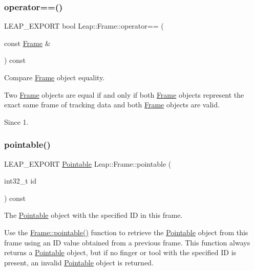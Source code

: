 \subsubsection{\texorpdfstring{operator==()}{operator==()}}
{\footnotesize\ttfamily L\+E\+A\+P\+\_\+\+E\+X\+P\+O\+RT bool Leap\+::\+Frame\+::operator== (\begin{DoxyParamCaption}\item[{const \hyperlink{class_leap_1_1_frame}{Frame} \&}]{ }\end{DoxyParamCaption}) const}

Compare \hyperlink{class_leap_1_1_frame}{Frame} object equality.


\begin{DoxyCodeInclude}
\end{DoxyCodeInclude}


Two \hyperlink{class_leap_1_1_frame}{Frame} objects are equal if and only if both \hyperlink{class_leap_1_1_frame}{Frame} objects represent the exact same frame of tracking data and both \hyperlink{class_leap_1_1_frame}{Frame} objects are valid. \begin{DoxySince}{Since}
1. 
\end{DoxySince}
\mbox{\label{class_leap_1_1_frame_aa60a6824c815e54fcab21c549c2f77ac}} 
\subsubsection{\texorpdfstring{pointable()}{pointable()}}
{\footnotesize\ttfamily L\+E\+A\+P\+\_\+\+E\+X\+P\+O\+RT \hyperlink{class_leap_1_1_pointable}{Pointable} Leap\+::\+Frame\+::pointable (\begin{DoxyParamCaption}\item[{int32\+\_\+t}]{id }\end{DoxyParamCaption}) const}

The \hyperlink{class_leap_1_1_pointable}{Pointable} object with the specified ID in this frame.

Use the \hyperlink{class_leap_1_1_frame_aa60a6824c815e54fcab21c549c2f77ac}{Frame\+::pointable()} function to retrieve the \hyperlink{class_leap_1_1_pointable}{Pointable} object from this frame using an ID value obtained from a previous frame. This function always returns a \hyperlink{class_leap_1_1_pointable}{Pointable} object, but if no finger or tool with the specified ID is present, an invalid \hyperlink{class_leap_1_1_pointable}{Pointable} object is returned.


